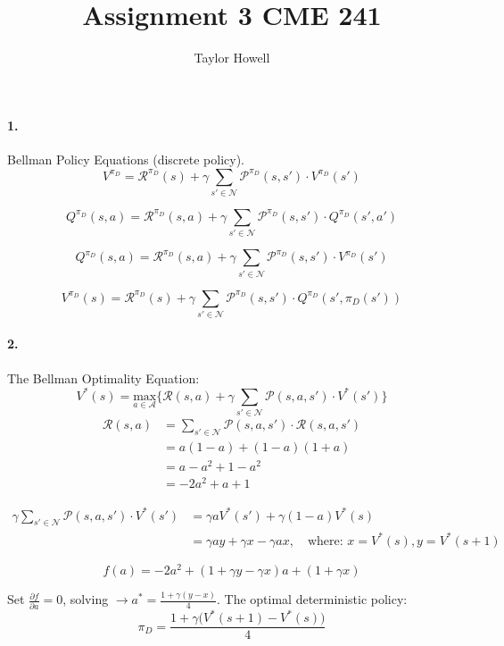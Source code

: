 \documentclass[12pt]{article}
\title{Assignment 3 CME 241}
\author{Taylor Howell}
\begin{document}
\maketitle

\paragraph{1.} Bellman Policy Equations (discrete policy).
$$V^{\pi_D} = \mathcal{R}^{\pi_D}(s) + \gamma \sum\limits_{s' \in \mathcal{N}} \mathcal{P}^{\pi_D}(s, s') \cdot V^{\pi_D}(s')$$

$$Q^{\pi_D}(s,a) = \mathcal{R}^{\pi_D}(s, a) + \gamma \sum\limits_{s' \in \mathcal{N}} \mathcal{P}^{\pi_D}(s, s') \cdot Q^{\pi_D}(s', a')$$

$$Q^{\pi_D}(s,a) = \mathcal{R}^{\pi_D}(s, a) + \gamma \sum\limits_{s' \in \mathcal{N}} \mathcal{P}^{\pi_D}(s, s') \cdot V^{\pi_D}(s')$$

$$V^{\pi_D}(s) = \mathcal{R}^{\pi_D}(s) + \gamma \sum\limits_{s' \in \mathcal{N}} \mathcal{P}^{\pi_D}(s, s') \cdot Q^{\pi_D}(s',\pi_D(s'))$$

\paragraph{2.}
The Bellman Optimality Equation:
$$ V^{*}(s) = \underset{a \in \mathcal{A}}{\mbox{max}} \{\mathcal{R}(s,a) + \gamma \sum\limits_{s' \in \mathcal{N}} \mathcal{P}(s,a,s') \cdot V^{*}(s')\}$$
\begin{align*}
	\mathcal{R}(s,a) &= \sum\limits_{s' \in \mathcal{N}} \mathcal{P}(s,a,s') \cdot \mathcal{R}(s,a,s') \\
	&= a (1 - a) + (1 - a) (1 + a)\\
	&= a - a^2 + 1 - a^2 \\
	&= -2 a^2 + a + 1
\end{align*}

\begin{align*}
	 \gamma \sum\limits_{s' \in \mathcal{N}} \mathcal{P}(s,a,s') \cdot V^{*}(s') &= \gamma a V^{*}(s') + \gamma (1 - a) V^{*}(s)\\
	 &= \gamma a y  + \gamma x - \gamma a x, \quad \mbox{where: } x = V^{*}(s), y = V^{*}(s+1)
\end{align*}

$$ f(a) = -2 a^2 + (1 + \gamma y - \gamma x) a + (1 + \gamma x)$$

Set $\frac{\partial f}{\partial a} = 0$, solving $\rightarrow a^{*} = \frac{1 + \gamma (y - x)}{4}$. The optimal deterministic policy:
$$\pi_D = \frac{1 + \gamma \Big(V^{*}(s+1) - V^{*}(s)\Big)}{4}$$
\end{document}
